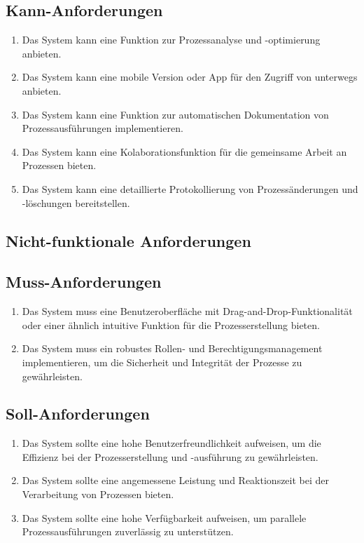 \subsection*{Kann-Anforderungen}
\begin{enumerate}[label=\textbf{K\arabic*.}]
    \item Das System kann eine Funktion zur Prozessanalyse und -optimierung anbieten.
    \item Das System kann eine mobile Version oder App für den Zugriff von unterwegs anbieten.
    \item Das System kann eine Funktion zur automatischen Dokumentation von Prozessausführungen implementieren.
    \item Das System kann eine Kolaborationsfunktion für die gemeinsame Arbeit an Prozessen bieten.
    \item Das System kann eine detaillierte Protokollierung von Prozessänderungen und -löschungen bereitstellen.
\end{enumerate}
\newpage
\subsection{Nicht-funktionale Anforderungen} \label{nf_Anforderungen}
\subsection*{Muss-Anforderungen}
\begin{enumerate}[label=\textbf{NM\arabic*.}]
    \item Das System muss eine Benutzeroberfläche mit Drag-and-Drop-Funktionalität oder einer ähnlich intuitive Funktion für die Prozesserstellung bieten.
    \item Das System muss ein robustes Rollen- und Berechtigungsmanagement implementieren, um die Sicherheit und Integrität der Prozesse zu gewährleisten.
\end{enumerate}
\subsection*{Soll-Anforderungen}
\begin{enumerate}[label=\textbf{NS\arabic*.}]
    \item Das System sollte eine hohe Benutzerfreundlichkeit aufweisen, um die Effizienz bei der Prozesserstellung und -ausführung zu gewährleisten.
    \item Das System sollte eine angemessene Leistung und Reaktionszeit bei der Verarbeitung von Prozessen bieten.
    \item Das System sollte eine hohe Verfügbarkeit aufweisen, um parallele Prozessausführungen zuverlässig zu unterstützen.
\end{enumerate}
